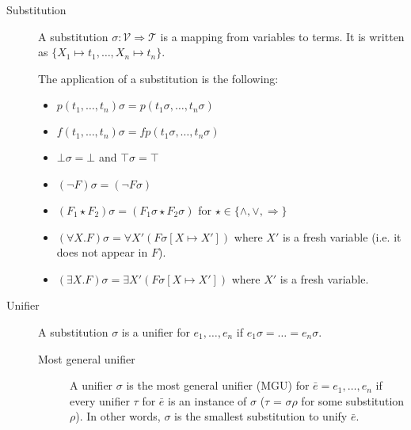 \begin{description}
    \item[Substitution] 
        A substitution $\sigma: \mathcal{V} \Rightarrow \mathcal{T}$ is a mapping from variables to terms.
        It is written as $\{ X_1 \mapsto t_1, \dots, X_n \mapsto t_n \}$.

        The application of a substitution is the following:
        \begin{itemize}
            \item $p(t_1, \dots, t_n)\sigma = p(t_1\sigma, \dots, t_n\sigma)$
            \item $f(t_1, \dots, t_n)\sigma = fp(t_1\sigma, \dots, t_n\sigma)$
            \item $\bot\sigma = \bot$ and $\top\sigma = \top$
            \item $(\lnot F)\sigma = (\lnot F\sigma)$
            \item $(F_1 \star F_2)\sigma = (F_1\sigma \star F_2\sigma)$ for $\star \in \{ \land, \vee, \Rightarrow \}$
            \item $(\forall X.F)\sigma = \forall X' (F \sigma[X \mapsto X'])$ where $X'$ is a fresh variable (i.e. it does not appear in $F$).
            \item $(\exists X.F)\sigma = \exists X' (F \sigma[X \mapsto X'])$ where $X'$ is a fresh variable.
        \end{itemize}

    \item[Unifier] 
        A substitution $\sigma$ is a unifier for $e_1, \dots, e_n$ if $e_1\sigma = \dots = e_n\sigma$.
        
        \begin{description}
            \item[Most general unifier] 
                A unifier $\sigma$ is the most general unifier (MGU) for $\bar{e} = e_1, \dots, e_n$ if
                every unifier $\tau$ for $\bar{e}$ is an instance of $\sigma$ ($\tau$ = $\sigma\rho$ for some substitution $\rho$).
                In other words, $\sigma$ is the smallest substitution to unify $\bar{e}$.
        \end{description} 
\end{description}